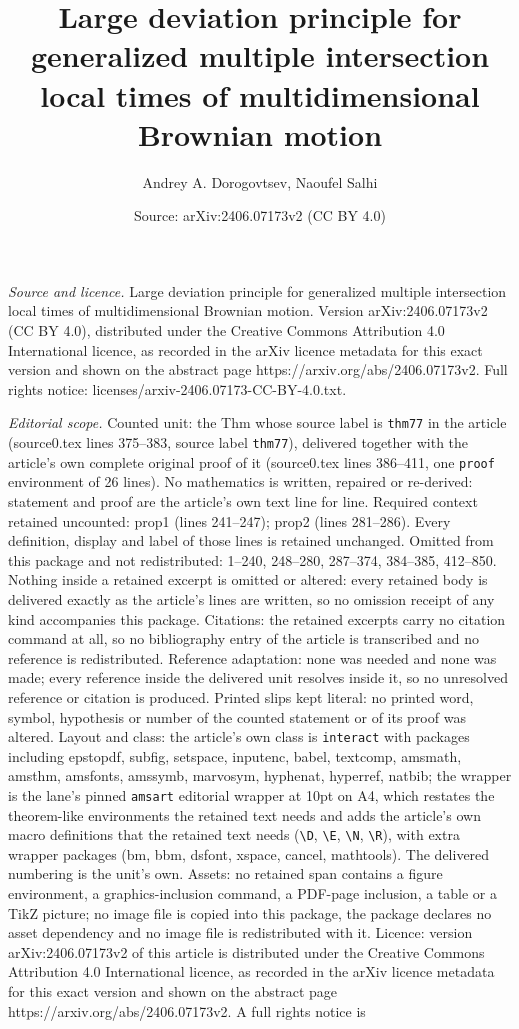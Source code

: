 \documentclass[10pt,a4paper]{amsart}
\title[Large deviation principle for generalized multiple intersect]{Large deviation principle for generalized multiple intersection local times of multidimensional Brownian motion}
\author{Andrey A. Dorogovtsev, Naoufel Salhi}
\date{Source: arXiv:2406.07173v2 (CC BY 4.0)}
\begin{document}
\maketitle

\noindent\emph{Source and licence.} Large deviation principle for generalized multiple intersection local times of multidimensional Brownian motion. Version arXiv:2406.07173v2 (CC BY 4.0), distributed under the Creative Commons Attribution 4.0 International licence, as recorded in the arXiv licence metadata for this exact version and shown on the abstract page https://arxiv.org/abs/2406.07173v2. Full rights notice: licenses/arxiv-2406.07173-CC-BY-4.0.txt.\par\smallskip

\noindent\textit{Editorial scope.} Counted unit: the Thm whose source label is \texttt{thm77} in the article (source0.tex lines 375--383, source label \texttt{thm77}), delivered together with the article's own complete original proof of it (source0.tex lines 386--411, one \texttt{proof} environment of 26 lines). No mathematics is written, repaired or re-derived: statement and proof are the article's own text line for line. Required context retained uncounted: prop1 (lines 241--247); prop2 (lines 281--286). Every definition, display and label of those lines is retained unchanged. Omitted from this package and not redistributed: 1--240, 248--280, 287--374, 384--385, 412--850. Nothing inside a retained excerpt is omitted or altered: every retained body is delivered exactly as the article's lines are written, so no omission receipt of any kind accompanies this package. Citations: the retained excerpts carry no citation command at all, so no bibliography entry of the article is transcribed and no reference is redistributed. Reference adaptation: none was needed and none was made; every reference inside the delivered unit resolves inside it, so no unresolved reference or citation is produced. Printed slips kept literal: no printed word, symbol, hypothesis or number of the counted statement or of its proof was altered. Layout and class: the article's own class is \texttt{interact} with packages including epstopdf, subfig, setspace, inputenc, babel, textcomp, amsmath, amsthm, amsfonts, amssymb, marvosym, hyphenat, hyperref, natbib; the wrapper is the lane's pinned \texttt{amsart} editorial wrapper at 10pt on A4, which restates the theorem-like environments the retained text needs and adds the article's own macro definitions that the retained text needs (\texttt{\textbackslash D}, \texttt{\textbackslash E}, \texttt{\textbackslash N}, \texttt{\textbackslash R}), with extra wrapper packages (bm, bbm, dsfont, xspace, cancel, mathtools). The delivered numbering is the unit's own. Assets: no retained span contains a figure environment, a graphics-inclusion command, a PDF-page inclusion, a table or a TikZ picture; no image file is copied into this package, the package declares no asset dependency and no image file is redistributed with it. Licence: version arXiv:2406.07173v2 of this article is distributed under the Creative Commons Attribution 4.0 International licence, as recorded in the arXiv licence metadata for this exact version and shown on the abstract page https://arxiv.org/abs/2406.07173v2. A full rights notice is 
\end{document}
